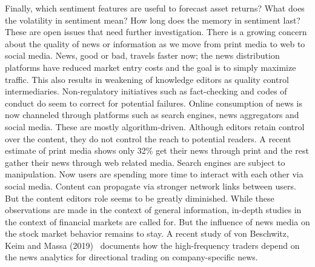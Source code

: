 Finally, which sentiment features are useful to forecast asset returns? What does the volatility in sentiment mean? How long does the memory in sentiment last? These are open issues that need further investigation. There is a growing concern about the quality of news or information as we move from print media to web to social media. News, good or bad, travels faster now; the news distribution platforms have reduced market entry costs and the goal is to simply maximize traffic. This also results in weakening of knowledge editors as quality control intermediaries. Non-regulatory initiatives such as fact-checking and codes of conduct do seem to correct for potential failures. Online consumption of news is now channeled through platforms such as search engines, news aggregators and social media. These are mostly algorithm-driven. Although editors retain control over the content, they do not control the reach to potential readers. A recent estimate of print media shows only 32\% get their news through print and the rest gather their news through web related media. Search engines are subject to manipulation. Now users are spending more time to interact with each other via social media. Content can propagate via stronger network links between users. But the content editors role seems to be greatly diminished. While these observations are made in the context of general information, in-depth studies in the context of financial markets are called for. But the influence of news media on the stock market behavior remains to stay. A recent study of von Beschwitz, Keim and Massa (2019)~\cite{keimmass2019} documents how the high-frequency traders depend on the news analytics for directional trading on company-specific news. 